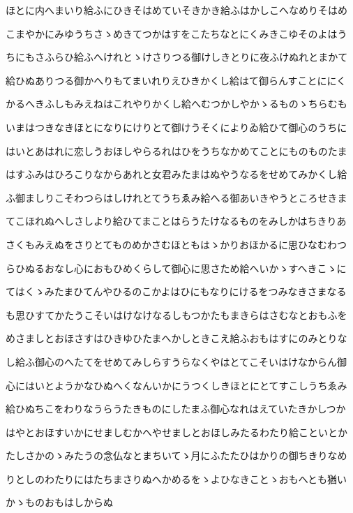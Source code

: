 \documentclass[a4paper,11pt,landscape]{ltjtarticle}
\begin{document}
\par\medskip
ほとに内へまいり給ふにひきそはめていそきかき給ふはかしこへなめりそはめ
\par\medskip
こまやかにみゆうちさゝめきてつかはすをこたちなとにくみきこゆそのよはう
\par\medskip
ちにもさふらひ給ふへけれとゝけさりつる御けしきとりに夜ふけぬれとまかて
\par\medskip
給ひぬありつる御かへりもてまいれりえひきかくし給はて御らんすことににく
\par\medskip
かるへきふしもみえねはこれやりかくし給へむつかしやかゝるものゝちらむも
\par\medskip
いまはつきなきほとになりにけりとて御けうそくによりゐ給ひて御心のうちに
\par\medskip
はいとあはれに恋しうおほしやらるれはひをうちなかめてことにものものたま
\par\medskip
はすふみはひろこりなからあれと女君みたまはぬやうなるをせめてみかくし給
\par\medskip
ふ御ましりこそわつらはしけれとてうちゑみ給へる御あいきやうところせきま
\par\medskip
てこほれぬへしさしより給ひてまことはらうたけなるものをみしかはちきりあ
\par\medskip
さくもみえぬをさりとてものめかさむほともはゝかりおほかるに思ひなむわつ
\par\medskip
らひぬるおなし心におもひめくらして御心に思さため給へいかゝすへきこゝに
\par\medskip
てはくゝみたまひてんやひるのこかよはひにもなりにけるをつみなきさまなる
\par\medskip
も思ひすてかたうこそいはけなけなるしもつかたもまきらはさむなとおもふを
\par\medskip
めさましとおほさすはひきゆひたまへかしときこえ給ふおもはすにのみとりな
\par\medskip
し給ふ御心のへたてをせめてみしらすうらなくやはとてこそいはけなからん御
\par\medskip
心にはいとようかなひぬへくなんいかにうつくしきほとにとてすこしうちゑみ
\par\medskip
給ひぬちこをわりなうらうたきものにしたまふ御心なれはえていたきかしつか
\par\medskip
はやとおほすいかにせましむかへやせましとおほしみたるわたり給こといとか
\par\medskip
たしさかのゝみたうの念仏なとまちいてゝ月にふたたひはかりの御ちきりなめ
\par\medskip
りとしのわたりにはたちまさりぬへかめるをゝよひなきことゝおもへとも猶い
\par\medskip
かゝものおもはしからぬ
\par\medskip
\end{document}
